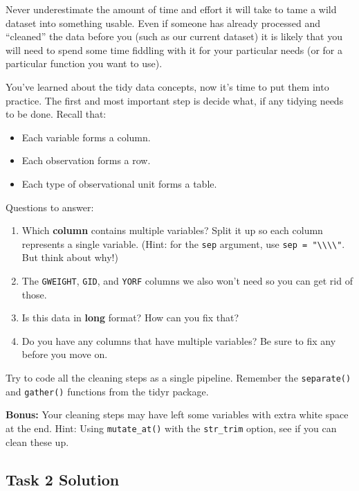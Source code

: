 \documentclass[
]{book}
\providecommand{\tightlist}{%
  \setlength{\itemsep}{0pt}\setlength{\parskip}{0pt}}
\begin{document}
Never underestimate the amount of time and effort it will take to tame a wild dataset into something usable. Even if someone has already processed and ``cleaned'' the data before you (such as our current dataset) it is likely that you will need to spend some time fiddling with it for your particular needs (or for a particular function you want to use).

You've learned about the tidy data concepts, now it's time to put them into practice. The first and most important step is decide what, if any tidying needs to be done. Recall that:

\begin{itemize}
\tightlist
\item
  Each variable forms a column.
\item
  Each observation forms a row.
\item
  Each type of observational unit forms a table.
\end{itemize}

Questions to answer:

\begin{enumerate}
\def\labelenumi{\arabic{enumi}.}
\tightlist
\item
  Which \textbf{column} contains multiple variables? Split it up so each column represents a single variable. (Hint: for the \texttt{sep} argument, use \texttt{sep\ =\ "\textbackslash{}\textbackslash{}\textbar{}\textbackslash{}\textbackslash{}\textbar{}"}. But think about why!)
\item
  The \texttt{GWEIGHT}, \texttt{GID}, and \texttt{YORF} columns we also won't need so you can get rid of those.
\item
  Is this data in \textbf{long} format? How can you fix that?
\item
  Do you have any columns that have multiple variables? Be sure to fix any before you move on.
\end{enumerate}

Try to code all the cleaning steps as a single pipeline. Remember the \texttt{separate()} and \texttt{gather()} functions from the tidyr package.

\textbf{Bonus:} Your cleaning steps may have left some variables with extra white space at the end. Hint: Using \texttt{mutate\_at()} with the \texttt{str\_trim} option, see if you can clean these up.

\subsection*{Task 2 Solution}\label{task-2-solution}
\end{document}
